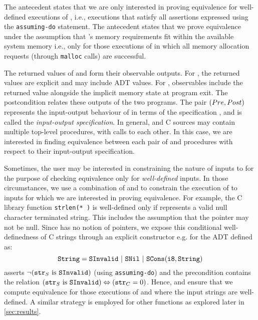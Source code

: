 The \sdef{} antecedent states that we are only interested in proving equivalence for
well-defined executions of \sprog{}, i.e., executions that satisfy all assertions expressed
using the {\tt assuming-do} statement.
The \cfits{} antecedent states that we prove equivalence under the assumption that \cprog{}'s memory
requirements fit within the available system memory i.e., only for those executions of \cprog{}
in which all memory allocation requests (through {\tt malloc} calls) are successful.

The returned values of \sprog{} and \cprog{} form their observable outputs.
For \sprog{}, the returned values are explicit and may include ADT values.
For \cprog{}, observables include the returned value alongside the implicit memory state
at program exit.
The postcondition \post{} relates these outputs of the two programs.
The pair $({Pre}{},{Post}{})$ represents the input-output behaviour of \cprog{} in terms of the specification \sprog{},
and is called the {\em input-output specification}.
In general, \SpecL{} and C sources may contain multiple top-level procedures, with calls to each other.
In this case, we are interested in finding equivalence between each pair
of \sprog{} and \cprog{} procedures with respect to their input-output specification.

Sometimes, the user may be interested in constraining the nature of inputs to \cprog{}
for the purpose of checking equivalence only for {\em well-defined} inputs.
In those circumstances, we use a combination of \pre{} and \sdef{} to constrain
the execution of \cprog{} to inputs for which we are interested in proving equivalence.
For example, the C library function {\tt strlen(* )} is well-defined only if 
represents a valid null character terminated string.
This includes the assumption that the pointer  may not be null.
Since \SpecL{} has no notion of pointers, we expose this conditional well-definedness of C strings
through an explicit constructor e.g.  for the  ADT defined as:
$$
\type{String}=\cons{SInvalid}\ |\ \cons{SNil}\ |\ \cons{SCons}(\type{i8}, \type{String})
$$
\sdef{} asserts $\neg({\tt str}_{S}\ \mathrm{is}\ {\tt SInvalid})$ (using {\tt assuming-do}) and
the precondition \pre{} contains the relation $({\tt str}_{S}\ \mathrm{is}\ {\tt SInvalid}) \Leftrightarrow ({\tt str}_{C}=0)$.
Hence, \sdef{} and \pre{} ensure that we compute equivalence for those
executions of \sprog{} and \cprog{} where the input strings are well-defined.
A similar strategy is employed for other functions as explored later in \cref{sec:results}.

